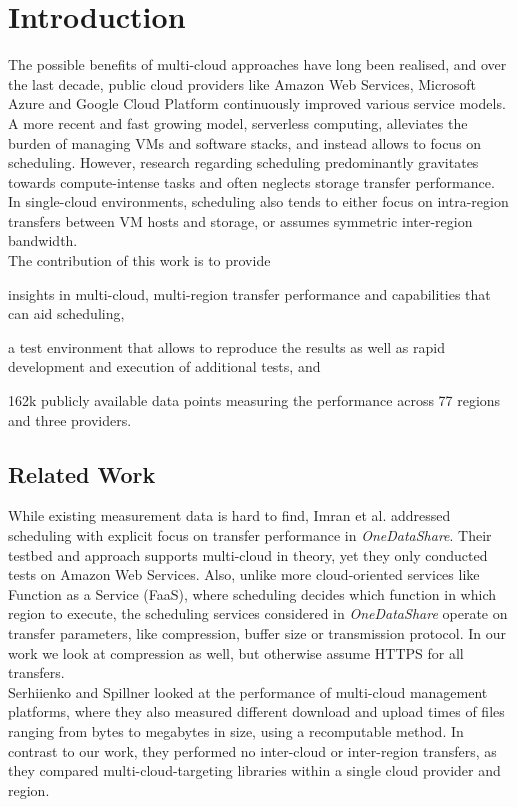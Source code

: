 \documentclass[a4paper,bibliography=totoc]{scrartcl}
\newcommand{\Azure}{Microsoft Azure\xspace}
\newcommand{\GCP}{Google Cloud Platform\xspace}
\newcommand{\AWS}{Amazon Web Services\xspace}
\begin{document}
\section{Introduction}
The possible benefits of multi-cloud approaches have long been realised,\cite{multi_cloud_expectations} and over the last decade, public cloud providers like \AWS, \Azure and \GCP continuously improved various service models.\cite{public_cloud_comparison} A more recent and fast growing model, serverless computing, alleviates the burden of managing VMs and software stacks, and instead allows to focus on scheduling.\cite{multi_cloud_serverless} However, research regarding scheduling predominantly gravitates towards compute-intense tasks and often neglects storage transfer performance.\cite{serverless_computing_and_scheduling}\\
In single-cloud environments, scheduling also tends to either focus on intra-region transfers between VM hosts and storage,\cite{network_aware_vm_migration,content_based_scheduling_vm} or assumes symmetric inter-region bandwidth.\cite{twin_sibling_faas}\\
The contribution of this work is to provide
\begin{inparaenum}[(i)]
    \item insights in multi-cloud, multi-region transfer performance and capabilities that can aid scheduling,
    \item a test environment that allows to reproduce the results as well as rapid development and execution of additional tests, and
    \item 162k publicly available data points measuring the performance across 77 regions and three providers.
\end{inparaenum}

\subsection{Related Work}
While existing measurement data is hard to find, Imran et al. addressed scheduling with explicit focus on transfer performance in \textit{OneDataShare}.\cite{data_transfer_scheduling} Their testbed and approach supports multi-cloud in theory, yet they only conducted tests on \AWS. Also, unlike more cloud-oriented services like Function as a Service (FaaS), where scheduling decides which function in which region to execute,\cite{faas_introduction} the scheduling services considered in \textit{OneDataShare} operate on transfer parameters, like compression, buffer size or transmission protocol. In our work we look at compression as well, but otherwise assume HTTPS for all transfers.\\
Serhiienko and Spillner looked at the performance of multi-cloud management platforms,\cite{recomputable_comarison_multi_cloud_platforms} where they also measured different download and upload times of files ranging from bytes to megabytes in size, using a recomputable method. In contrast to our work, they performed no inter-cloud or inter-region transfers, as they compared multi-cloud-targeting libraries within a single cloud provider and region.
\end{document}
